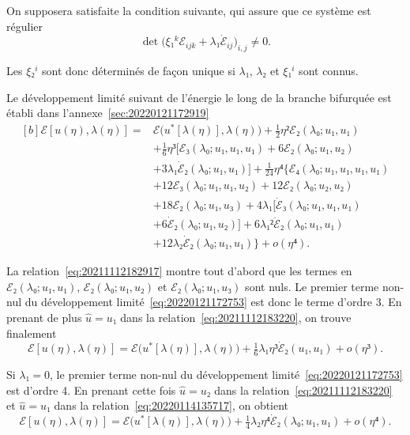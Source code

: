 \documentclass[12pt, final]{amsart}
\begin{document}
On supposera satisfaite la condition suivante, qui assure que ce système est régulier
\begin{equation}
  \det\bigl(ξ₁^kℰ_{ijk}+λ₁\dot{ℰ}_{ij}\bigr)_{i,j}\neq0.
\end{equation}

Les \(ξ₂^i\) sont donc déterminés de façon unique si \(λ₁\), \(λ₂\) et \(ξ₁^i\)
sont connus.

Le développement limité suivant de l'énergie le long de la branche bifurquée
est établi dans l'annexe~\ref{sec:20220121172919}
\begin{equation}
  \label{eq:20220121172753}
  \begin{aligned}[b]
    ℰ[u(η), λ(η)]={}&ℰ\bigl(u^*[λ(η)], λ(η)\bigr)
    +\tfrac12η²ℰ₂(λ₀; u₁, u₁)\\
    &+\tfrac16η³\bigl[ℰ₃(λ₀;u₁, u₁, u₁)+6ℰ₂(λ₀; u₁, u₂)\\
    &+3λ₁\dot{ℰ}₂(λ₀; u₁, u₁)\bigr]+\tfrac1{24}η⁴\bigl\{ℰ₄(λ₀;u₁, u₁, u₁, u₁)\\
    &+12ℰ₃(λ₀; u₁, u₁, u₂)+12ℰ₂(λ₀; u₂, u₂)\\
    &+18ℰ₂(λ₀; u₁, u₃)+4λ₁\bigl[\dot{ℰ}₃(λ₀; u₁, u₁, u₁)\\
    &+6\dot{ℰ}₂(λ₀; u₁, u₂)\bigr]+6λ₁²\ddot{ℰ}₂(λ₀; u₁, u₁)\\
    &+12λ₂\dot{ℰ}₂(λ₀; u₁, u₁)\bigr\}+o(η⁴).
  \end{aligned}
\end{equation}

La relation~\eqref{eq:20211112182917} montre tout d'abord que les termes en
\(ℰ₂(λ₀; u₁, u₁)\), \(ℰ₂(λ₀; u₁, u₂)\) et \(ℰ₂(λ₀; u₁, u₃)\) sont nuls. Le
premier terme non-nul du développement limité~\eqref{eq:20220121172753} est
donc le terme d'ordre 3. En prenant de plus \(\hat{u}=u₁\) dans la
relation~\eqref{eq:20211112183220}, on trouve
finalement
\begin{equation}
  ℰ[u(η), λ(η)]=ℰ\bigl(u^*[λ(η)], λ(η)\bigr)+\tfrac16λ₁η³\dot{ℰ}₂(u₁, u₁)+o(η³).
\end{equation}

Si \(λ₁=0\), le premier terme non-nul du développement
limité~\eqref{eq:20220121172753} est d'ordre 4. En prenant cette fois
\(\hat{u}=u₂\) dans la relation~\eqref{eq:20211112183220} et \(\hat{u}=u₁\)
dans la relation~\eqref{eq:20220114135717}, on
obtient
\begin{equation}
  ℰ[u(η), λ(η)]=ℰ\bigl(u^*[λ(η)], λ(η)\bigr)+\tfrac1{4}λ₂η⁴\dot{ℰ}₂(λ₀; u₁, u₁)+o(η⁴).
\end{equation}
\end{document}
